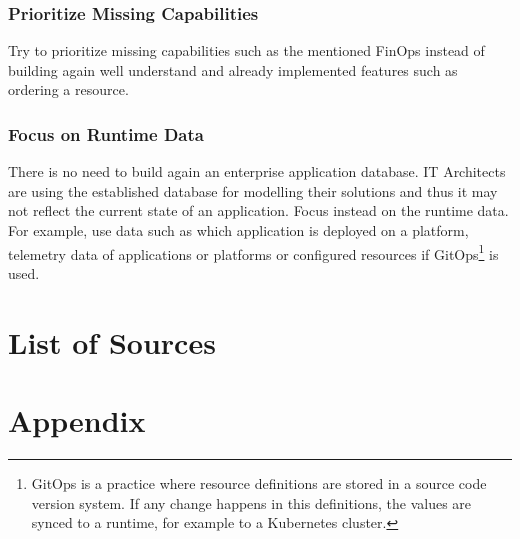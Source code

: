 \documentclass[a4paper,12pt]{article}
\begin{document}
    \subsubsection{Prioritize Missing Capabilities}
    Try to prioritize missing capabilities such as the mentioned FinOps instead of building again well understand and already
    implemented features such as ordering a resource.

    \subsubsection{Focus on Runtime Data}
    There is no need to build again an enterprise application database.
    IT Architects are using the established database for modelling their solutions and thus it may not reflect the current
    state of an application.
    Focus instead on the runtime data.
    For example, use data such as which application is deployed on a platform, telemetry data of applications or platforms or
    configured resources if GitOps\footnote{
        GitOps is a practice where resource definitions are stored in a source code version system. If any change
        happens in this definitions, the values are synced to a runtime, for example to a Kubernetes cluster.} is used.

    \pagebreak


    \section{List of Sources}
    \label{sec:bibliograhpy}
    \printbibliography[heading=none]


    \section{Appendix}
    \label{sec:appendix}
\end{document}
